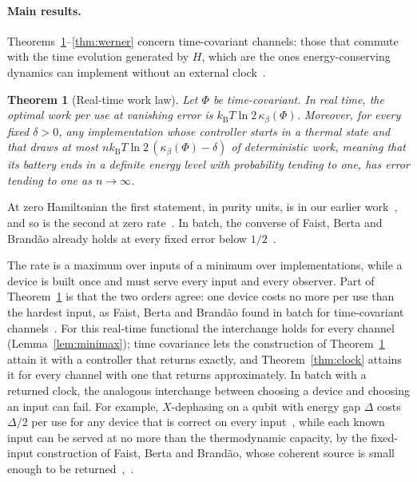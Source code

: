\documentclass[11pt]{article}
\newtheorem{theorem}{Theorem}
\theoremstyle{definition}
\theoremstyle{remark}
\newcommand{\kB}{k_{\mathrm B}}
\newcommand{\Trt}{\kappa_\beta}
\begin{document}
\paragraph{Main results.} Theorems~\ref{thm:law}--\ref{thm:werner} concern time-covariant channels: those that commute with the time evolution generated by $H$, which are the ones energy-conserving dynamics can implement without an external clock~\cite{Lostaglio15,FBB21}.

\begin{theorem}[Real-time work law]\label{thm:law}
Let $\Phi$ be time-covariant. In real time, the optimal work per use at vanishing error is $\kB T\ln 2\,\Trt(\Phi)$. Moreover, for every fixed $\delta>0$, any implementation whose controller starts in a thermal state and that draws at most $n\kB T\ln 2\,(\Trt(\Phi)-\delta)$ of deterministic work, meaning that its battery ends in a definite energy level with probability tending to one, has error tending to one as $n\to\infty$.
\end{theorem}

At zero Hamiltonian the first statement, in purity units, is in our earlier work~\cite{Memory,ImmediateDelivery,ClosedMemory}, and so is the second at zero rate~\cite{Flagship}. In batch, the converse of Faist, Berta and Brand\~ao already holds at every fixed error below $1/2$~\cite[Prop.~4.2]{FBB21}.

The rate is a maximum over inputs of a minimum over implementations, while a device is built once and must serve every input and every observer. Part of Theorem~\ref{thm:law} is that the two orders agree: one device costs no more per use than the hardest input, as Faist, Berta and Brand\~ao found in batch for time-covariant channels~\cite{FBB19}. For this real-time functional the interchange holds for every channel (Lemma~\ref{lem:minimax}); time covariance lets the construction of Theorem~\ref{thm:law} attain it with a controller that returns exactly, and Theorem~\ref{thm:clock} attains it for every channel with one that returns approximately. In batch with a returned clock, the analogous interchange between choosing a device and choosing an input can fail. For example, $X$-dephasing on a qubit with energy gap $\Delta$ costs $\Delta/2$ per use for any device that is correct on every input~\cite{KeepingTime}, while each known input can be served at no more than the thermodynamic capacity, by the fixed-input construction of Faist, Berta and Brand\~ao, whose coherent source is small enough to be returned~\cite[Prop.~8.3]{FBB21},~\cite{KeepingTime}.
\end{document}
